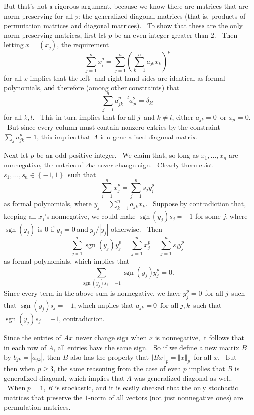 \documentclass{article}%
\begin{document}
But that's not a rigorous argument, because we know there are matrices that
are norm-preserving for all $p$: the generalized diagonal matrices (that is,
products of permutation matrices and diagonal matrices). \ To show that these
are the only norm-preserving matrices, first let $p$ be an even integer
greater than $2$. \ Then letting $x=\left(  x_{j}\right)  $, the requirement%
\begin{equation}
\sum_{j=1}^{n}x_{j}^{p}=\sum_{j=1}^{n}\left(  \sum_{k=1}^{n}a_{jk}%
x_{k}\right)  ^{p} \label{porthog}%
\end{equation}
for all $x$ implies that the left- and right-hand sides are identical as
formal polynomials, and therefore (among other constraints) that%
\[
\sum_{j=1}^{n}a_{jk}^{p-2}a_{jl}^{2}=\delta_{kl}%
\]
for all $k,l$. \ This in turn implies that for all $j$\ and $k\neq l$, either
$a_{jk}=0$\ or $a_{jl}=0$. \ But since every column must contain nonzero
entries by the constraint $\sum_{j}a_{jk}^{p}=1$, this implies that $A$ is a
generalized diagonal matrix.

Next let $p$ be an odd positive integer. \ We claim that, so long as
$x_{1},\ldots,x_{n}$ are nonnegative, the entries of $Ax$ never change sign.
\ Clearly there exist $s_{1},\ldots,s_{n}\in\left\{  -1,1\right\}  $\ such
that%
\[
\sum_{j=1}^{n}x_{j}^{p}=\sum_{j=1}^{n}s_{j}y_{j}^{p}%
\]
as formal polynomials, where $y_{j}=\sum_{k=1}^{n}a_{jk}x_{k}$. \ Suppose by
contradiction that, keeping all $x_{j}$'s nonnegative, we could make
$\operatorname*{sgn}\left(  y_{j}\right)  s_{j}=-1$ for some $j$, where
$\operatorname*{sgn}\left(  y_{j}\right)  $ is $0$ if $y_{j}=0$ and$\ y_{j}%
/\left\vert y_{j}\right\vert $ otherwise. \ Then%
\[
\sum_{j=1}^{n}\operatorname*{sgn}\left(  y_{j}\right)  y_{j}^{p}=\sum
_{j=1}^{n}x_{j}^{p}=\sum_{j=1}^{n}s_{j}y_{j}^{p}%
\]
as formal polynomials, which implies that%
\[
\sum_{\operatorname*{sgn}\left(  y_{j}\right)  s_{j}=-1}\operatorname*{sgn}%
\left(  y_{j}\right)  y_{j}^{p}=0.
\]
Since every term in the above sum is nonnegative, we have $y_{j}^{p}=0$\ for
all $j$\ such that $\operatorname*{sgn}\left(  y_{j}\right)  s_{j}=-1$, which
implies that $a_{jk}=0$\ for all $j,k$\ such that $\operatorname*{sgn}\left(
y_{j}\right)  s_{j}=-1$, contradiction.

Since the entries of $Ax$\ never change sign when $x$ is nonnegative, it
follows that in each row of $A$, all entries have the same sign. \ So if we
define a new matrix $B$ by $b_{jk}=\left\vert a_{jk}\right\vert $, then $B$
also has the property that $\left\Vert Bx\right\Vert _{p}=\left\Vert
x\right\Vert _{p}$\ for all $x$. \ But then when $p\geq3$, the same reasoning
from the case of even $p$ implies that $B$ is generalized diagonal, which
implies that $A$ was generalized diagonal as well. \ When $p=1$, $B$ is
stochastic, and it is easily checked that the only stochastic matrices that
preserve the $1$-norm of all vectors (not just nonnegative ones) are
permutation matrices.
\end{document}
